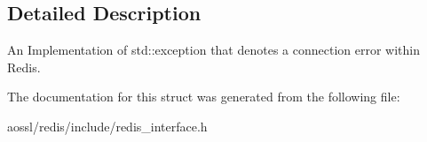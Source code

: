 \subsection{Detailed Description}
An Implementation of std\+::exception that denotes a connection error within Redis. 

The documentation for this struct was generated from the following file\+:\begin{DoxyCompactItemize}
\item 
aossl/redis/include/redis\+\_\+interface.\+h\end{DoxyCompactItemize}

